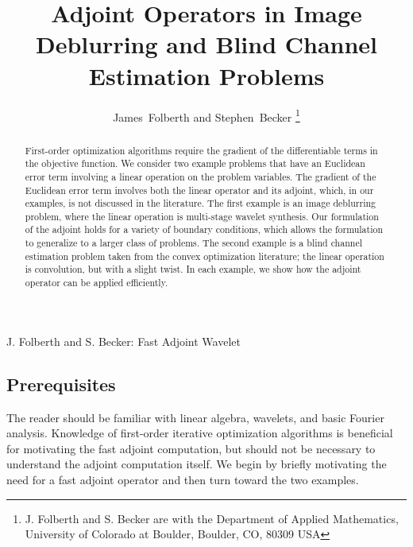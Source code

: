 \documentclass[journal]{IEEEtran}
\begin{document}
\title{Adjoint Operators in Image Deblurring and Blind Channel Estimation Problems}
\author{James~Folberth and 
        Stephen~Becker%
\thanks{J. Folberth and S. Becker are with the Department
of Applied Mathematics, University of Colorado at Boulder,
Boulder, CO, 80309 USA}}

%
{J. Folberth and S. Becker: Fast Adjoint Wavelet}

\maketitle

\begin{abstract}
   First-order optimization algorithms require the gradient of the differentiable terms in the objective function.  We consider two example problems that have an Euclidean error term involving a linear operation on the problem variables.  The gradient of the Euclidean error term involves both the linear operator and its adjoint, which, in our examples, is not discussed in the literature.  The first example is an image deblurring problem, where the linear operation is multi-stage wavelet synthesis.  Our formulation of the adjoint holds for a variety of boundary conditions, which allows the formulation to generalize to a larger class of problems.  The second example is a blind channel estimation problem taken from the convex optimization literature; the linear operation is convolution, but with a slight twist.  In each example, we show how the adjoint operator can be applied efficiently.
\end{abstract}

\subsection*{Prerequisites}
The reader should be familiar with linear algebra, wavelets, and basic Fourier analysis.  Knowledge of first-order iterative optimization algorithms is beneficial for motivating the fast adjoint computation, but should not be necessary to understand the adjoint computation itself.  We begin by briefly motivating the need for a fast adjoint operator and then turn toward the two examples.\\
\end{document}
